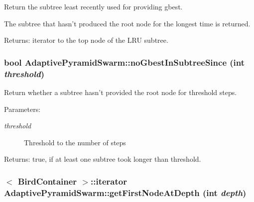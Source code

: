 Return the subtree least recently used for providing gbest. 

The subtree that hasn't produced the root node for the longest time is returned. \begin{Desc}
\item[Returns:]iterator to the top node of the LRU subtree. \end{Desc}
\hypertarget{classAdaptivePyramidSwarm_aa498e09dcf52a80be682a41e6da5563}{
\subsubsection{\setlength{\rightskip}{0pt plus 5cm}bool AdaptivePyramidSwarm::noGbestInSubtreeSince (int {\em threshold})}}
\label{classAdaptivePyramidSwarm_aa498e09dcf52a80be682a41e6da5563}


Return whether a subtree hasn't provided the root node for threshold steps. 

\begin{Desc}
\item[Parameters:]
\begin{description}
\item[{\em threshold}]Threshold to the number of steps \end{description}
\end{Desc}
\begin{Desc}
\item[Returns:]true, if at least one subtree took longer than threshold. \end{Desc}
\hypertarget{classAdaptivePyramidSwarm_6d97c910723d05a6fd4c9aec4187b33b}{
\subsubsection{$<$ {\bf BirdContainer} $>$::iterator AdaptivePyramidSwarm::getFirstNodeAtDepth (int {\em depth})}}
\label{classAdaptivePyramidSwarm_6d97c910723d05a6fd4c9aec4187b33b}


